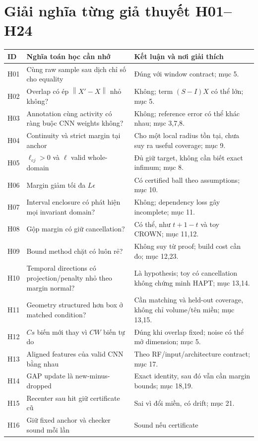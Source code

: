 \documentclass[11pt,a4paper]{article}
\newcommand{\norm}[1]{\left\lVert#1\right\rVert}
\theoremstyle{definition}
\begin{document}
\section{Giải nghĩa từng giả thuyết H01--H24}
\begin{longtable}{@{}p{0.85cm}p{6.9cm}p{5.8cm}@{}}
\toprule ID & Nghĩa toán học cần nhớ & Kết luận và nơi giải thích\\\midrule\endhead
H01 & Cùng raw sample sau dịch chỉ số cho equality & Đúng với window contract;
mục 5.\\
H02 & Overlap có ép $\norm{X'-X}$ nhỏ không? & Không; term $(S-I)X$ có thể
lớn; mục 5.\\
H03 & Annotation cùng activity có ràng buộc CNN weights không? & Không;
reference error có thể khác nhau; mục 3,7,8.\\
H04 & Continuity và strict margin tại anchor & Cho một local radius tồn tại,
chưa suy ra useful coverage; mục 9.\\
H05 & $\ell_{cj}>0$ và $\ell$ valid whole-domain & Đủ giữ target, không cần
biết exact infimum; mục 8.\\
H06 & Margin giảm tối đa $L\epsilon$ & Có certified ball theo assumptions;
mục 10.\\
H07 & Interval enclosure có phát hiện mọi invariant domain? & Không;
dependency loss gây incomplete; mục 11.\\
H08 & Gộp margin có giữ cancellation? & Có thể, như $t+1-t$ và toy CROWN;
mục 11,12.\\
H09 & Bound method chặt có luôn rẻ? & Không suy từ proof; build cost cần
đo; mục 12,23.\\
H10 & Temporal directions có projection/penalty nhỏ theo margin normal? & Là hypothesis;
toy có cancellation không chứng minh HAPT; mục 13,14.\\
H11 & Geometry structured hơn box ở matched condition? & Cần matching và
held-out coverage, không chỉ volume/tên miền; mục 13,15.\\
H12 & $Cs$ biến mới thay vì $CW$ biến tự do & Đúng khi overlap fixed;
noise có thể mở dimension; mục 5.\\
H13 & Aligned features của valid CNN bằng nhau & Theo RF/input/architecture
contract; mục 17.\\
H14 & GAP update là new-minus-dropped & Exact identity, sau đó vẫn cần
margin bounds; mục 18,19.\\
H15 & Recenter sau hit giữ certificate cũ & Sai vì đổi miền, có drift;
mục 21.\\
H16 & Giữ fixed anchor và checker sound mỗi lần & Sound nếu certificate

\end{longtable}
\end{document}
